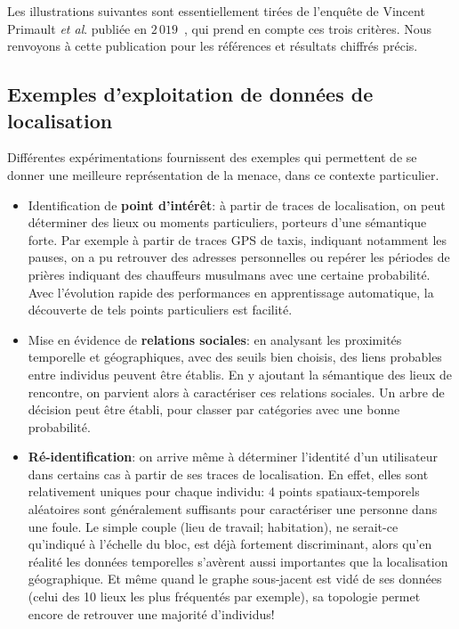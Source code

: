 \documentclass[a4paper,11pt]{article} %
\begin{document}
Les illustrations suivantes sont essentiellement tirées de l'enquête de Vincent Primault \textit{et al}. publiée en $2\,019$~\cite{PBMB19}, qui prend en compte ces trois critères. Nous renvoyons à cette publication pour les références et résultats chiffrés précis.
%
\subsection{Exemples d'exploitation de données de localisation}
Différentes expérimentations fournissent des exemples qui permettent de se donner une meilleure représentation de la menace, dans ce contexte particulier.
\begin{itemize}
    \item 
    Identification de \og \textbf{point d'intérêt}\fg{}: à partir de traces de localisation, on peut déterminer des lieux ou moments particuliers, porteurs d'une sémantique forte. 
    Par exemple à partir de traces GPS de taxis, indiquant notamment les pauses, on a pu retrouver des adresses personnelles ou repérer les périodes de prières indiquant des chauffeurs musulmans avec une certaine probabilité.
    Avec l'évolution rapide des performances en apprentissage automatique, la découverte de tels points particuliers est facilité.
    \item 
    Mise en évidence de \textbf{relations sociales}: en analysant les proximités temporelle et géographiques, avec des seuils bien choisis, des liens probables entre individus peuvent être établis. 
    En y ajoutant la sémantique des lieux de rencontre, on parvient alors à caractériser ces relations sociales. 
    Un arbre de décision peut être établi, pour classer par catégories avec une bonne probabilité.
    \item 
    \textbf{Ré-identification}: on arrive même à déterminer l'identité d'un utilisateur dans certains cas à partir de ses traces de localisation. 
    En effet, elles sont relativement uniques pour chaque individu: 4 points spatiaux-temporels aléatoires sont généralement suffisants pour caractériser une personne dans une foule. 
    Le simple couple (lieu de travail; habitation), ne serait-ce qu'indiqué à l'échelle du \og bloc\fg{}, est déjà fortement discriminant, alors qu'en réalité les données temporelles s'avèrent aussi importantes que la localisation géographique.
    Et même quand le graphe sous-jacent est vidé de ses données (celui des 10 lieux les plus fréquentés par exemple), sa topologie permet encore de retrouver une majorité d'individus!\\

\end{itemize}
\end{document}
